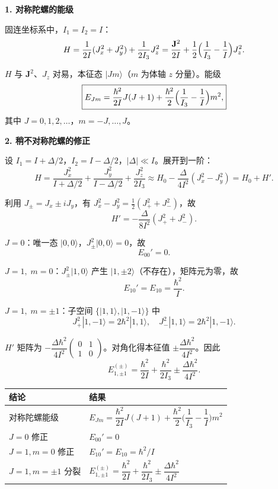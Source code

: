\begin{derivationbox}[标准解题过程]
\textbf{1. 对称陀螺的能级}

固连坐标系中，$I_1=I_2=I$：
\[
H=\frac{1}{2I}(J_x^2+J_y^2)+\frac{1}{2I_3}J_z^2=\frac{\mathbf{J}^2}{2I}+\frac12\Bigl(\frac{1}{I_3}-\frac{1}{I}\Bigr)J_z^2.
\]

$H$ 与 $\mathbf{J}^2$、$J_z$ 对易，本征态 $|Jm\rangle$（$m$ 为体轴 $z$ 分量）。能级
\begin{equation}
\boxed{E_{Jm}=\frac{\hbar^2}{2I}J(J+1)+\frac{\hbar^2}{2}\Bigl(\frac{1}{I_3}-\frac{1}{I}\Bigr)m^2,}
\end{equation}
其中 $J=0,1,2,\ldots$，$m=-J,\ldots,J$。

\textbf{2. 稍不对称陀螺的修正}

设 $I_1=I+\Delta/2$，$I_2=I-\Delta/2$，$|\Delta|\ll I$。展开到一阶：
\[
H=\frac{J_x^2}{I+\Delta/2}+\frac{J_y^2}{I-\Delta/2}+\frac{J_z^2}{2I_3}\approx H_0-\frac{\Delta}{4I^2}(J_x^2-J_y^2)=H_0+H'.
\]

利用 $J_\pm=J_x\pm iJ_y$，有 $J_x^2-J_y^2=\frac12(J_+^2+J_-^2)$，故
\[
H'=-\frac{\Delta}{8I^2}(J_+^2+J_-^2).
\]

\textit{$J=0$}：唯一态 $|0,0\rangle$，$J_\pm^2|0,0\rangle=0$，故
\[
E_{00}'=0.
\]

\textit{$J=1,\;m=0$}：$J_\pm^2|1,0\rangle$ 产生 $|1,\pm2\rangle$（不存在），矩阵元为零，故
\[
E_{10}'=E_{10}=\frac{\hbar^2}{I}.
\]

\textit{$J=1,\;m=\pm1$}：子空间 $\{|1,1\rangle,|1,-1\rangle\}$ 中
\[
J_+^2|1,-1\rangle=2\hbar^2|1,1\rangle,\quad J_-^2|1,1\rangle=2\hbar^2|1,-1\rangle.
\]

$H'$ 矩阵为 $-\dfrac{\Delta\hbar^2}{4I^2}\begin{pmatrix}0&1\\1&0\end{pmatrix}$。对角化得本征值 $\pm\dfrac{\Delta\hbar^2}{4I^2}$。因此
\begin{equation}
\boxed{E_{1,\pm1}^{(\pm)}=\frac{\hbar^2}{2I}+\frac{\hbar^2}{2I_3}\pm\frac{\Delta\hbar^2}{4I^2}.}
\end{equation}
\end{derivationbox}

\begin{formulabox}[答案汇总]
\begin{center}
\begin{tabular}{ll}
\toprule
\textbf{结论} & \textbf{结果} \\
\midrule
对称陀螺能级 & $E_{Jm}=\dfrac{\hbar^2}{2I}J(J+1)+\dfrac{\hbar^2}{2}\bigl(\dfrac{1}{I_3}-\dfrac{1}{I}\bigr)m^2$ \\
$J=0$ 修正 & $E_{00}'=0$ \\
$J=1,m=0$ 修正 & $E_{10}'=E_{10}=\hbar^2/I$ \\
$J=1,m=\pm1$ 分裂 & $E_{1,\pm1}^{(\pm)}=\dfrac{\hbar^2}{2I}+\dfrac{\hbar^2}{2I_3}\pm\dfrac{\Delta\hbar^2}{4I^2}$ \\
\bottomrule
\end{tabular}
\end{center}
\end{formulabox}

